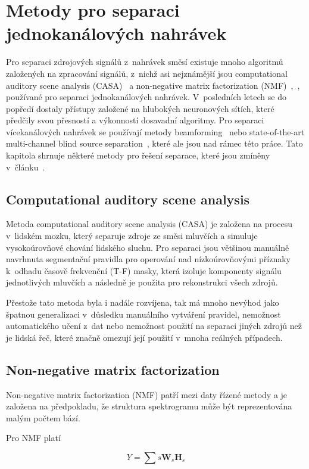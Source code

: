 \section{Metody pro separaci jednokanálových nahrávek}
Pro separaci zdrojových signálů z~nahrávek směsí existuje mnoho algoritmů založených na zpracování signálů, z~nichž asi nejznámější jsou computational auditory scene analysis (CASA)~\cite{choi2005blind} a non-negative matrix factorization (NMF)~\cite{NIPS2000_1861},~\cite{yoshii2013beyond}, používané pro separaci jednokanálových nahrávek. V~posledních letech se do popředí dostaly přístupy založené na hlubokých neuronových sítích, které předčily svou přesností a výkonností dosavadní algoritmy. Pro separaci vícekanálových nahrávek se používají metody beamforming~\cite{adel2012beamforming} nebo state-of-the-art multi-channel blind source separation~\cite{Negro_2016}, které ale jsou nad rámec této práce. Tato kapitola shrnuje některé metody pro řešení separace, které jsou zmíněny v~článku~\cite{speechseparation}.


\subsection{Computational auditory scene analysis}
Metoda computational auditory scene analysis (CASA) je založena na procesu v~lidském mozku, který separuje zdroje ze směsi mluvčích a simuluje vysokoúrovňové chování lidského sluchu. Pro separaci jsou většinou manuálně navrhnuta segmentační pravidla pro operování nad nízkoúrovňovými příznaky k~odhadu časově frekvenční (T-F) masky, která izoluje komponenty signálu jednotlivých mluvčích a následně je použita pro rekonstrukci všech zdrojů.

Přestože tato metoda byla i nadále rozvíjena, tak má mnoho nevýhod jako špatnou generalizaci v~důsledku manuálního vytváření pravidel, nemožnost automatického učení z~dat nebo nemožnost použití na separaci jiných zdrojů než je lidská řeč, které značně omezují její použití v~mnoha reálných případech.


\subsection{Non-negative matrix factorization}
Non-negative matrix factorization (NMF) patří mezi daty řízené metody a je založena na předpokladu, že struktura spektrogramu může být reprezentována malým počtem bází.

Pro NMF platí

\begin{equation}
  Y = \sum{s}\textbf{W}_s\textbf{H}_s
\end{equation}

